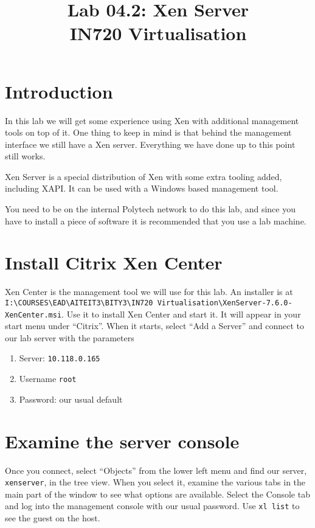 \documentclass{article}
\begin{document}
\title{Lab 04.2: Xen Server\\ IN720 Virtualisation}
\date{}
\maketitle

\section*{Introduction}
In this lab we will get some experience using Xen with additional management tools on top of it. One thing to keep in mind is that behind the management interface we still have a Xen server. Everything we have done up to this point still works.

Xen Server is a special distribution of Xen with some extra tooling added, including XAPI. It can be used with a Windows 
based management tool. 

You need to be on the internal Polytech network to do this lab, and since you have to install a piece of software it is recommended that you use a lab machine.
 
 \section{Install Citrix Xen Center}
 Xen Center is the management tool we will use for this lab. An installer is at \\
 \texttt{I:{\textbackslash}COURSES{\textbackslash}EAD{\textbackslash}AITEIT3{\textbackslash}BITY3{\textbackslash}IN720 Virtualisation{\textbackslash}XenServer-7.6.0-XenCenter.msi}. Use it to install
 Xen Center and start it. It will appear in your start menu under ``Citrix''. When it starts, select ``Add a Server'' and connect to our lab server with the parameters
 
 \begin{enumerate}
  \item Server: \texttt{10.118.0.165}
  \item Username \texttt{root}
  \item Password: our usual default
  \end{enumerate}
  
  
  
  \section{Examine the server console}
 
 Once you connect, select ``Objects'' from the lower left menu and find our server, \texttt{xenserver}, in the tree 
 view. When you select it, examine the various tabs in the main part of the window to see what options are available. 
 Select the Console tab and log into the management console with our usual password. Use \texttt{xl list} to see the guest on the host.
 
\end{document}
